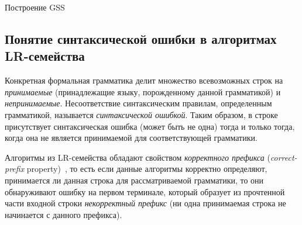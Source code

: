\begin{algorithm}[H]
\begin{algorithmic}[1]
\caption{Построение GSS}
\label{gss_construction}
   
  \Else
    \EndFor
  \EndIf
\EndFunction

    \EndIf
      \EndFor
    \EndIf
  \EndIf
\EndFunction
\end{algorithmic}
\end{algorithm}

\subsection{Понятие синтаксической ошибки в алгоритмах LR-семейства}
Конкретная формальная грамматика делит множество всевозможных строк на \emph{принимаемые} (принадлежащие языку, порожденному данной грамматикой) и \emph{непринимаемые}. Несоответствие синтаксическим правилам, определенным грамматикой, называется  \emph{синтаксической ошибкой}. Таким образом, в строке присутствует синтаксическая ошибка (может быть не одна) тогда и только тогда, когда она не является принимаемой для соответствующей грамматики.

Алгоритмы из LR-семейства обладают свойством \emph{корректного префикса} (\emph{correct-prefix} property)~\cite{Grune}, то есть если данные алгоритмы корректно определяют, принимается ли данная строка для рассматриваемой грамматики, то они обнаруживают ошибку на первом терминале, который образует из прочтенной части входной строки \emph{некорректный префикс} (ни одна принимаемая строка не начинается с данного префикса).

